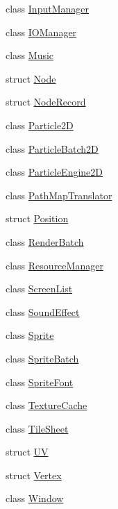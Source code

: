 \begin{DoxyCompactItemize}
\item 
class \hyperlink{class_otherwise_1_1_input_manager}{Input\+Manager}
\item 
class \hyperlink{class_otherwise_1_1_i_o_manager}{I\+O\+Manager}
\item 
class \hyperlink{class_otherwise_1_1_music}{Music}
\item 
struct \hyperlink{struct_otherwise_1_1_node}{Node}
\item 
struct \hyperlink{struct_otherwise_1_1_node_record}{Node\+Record}
\item 
class \hyperlink{class_otherwise_1_1_particle2_d}{Particle2D}
\item 
class \hyperlink{class_otherwise_1_1_particle_batch2_d}{Particle\+Batch2D}
\item 
class \hyperlink{class_otherwise_1_1_particle_engine2_d}{Particle\+Engine2D}
\item 
class \hyperlink{class_otherwise_1_1_path_map_translator}{Path\+Map\+Translator}
\item 
struct \hyperlink{struct_otherwise_1_1_position}{Position}
\item 
class \hyperlink{class_otherwise_1_1_render_batch}{Render\+Batch}
\item 
class \hyperlink{class_otherwise_1_1_resource_manager}{Resource\+Manager}
\item 
class \hyperlink{class_otherwise_1_1_screen_list}{Screen\+List}
\item 
class \hyperlink{class_otherwise_1_1_sound_effect}{Sound\+Effect}
\item 
class \hyperlink{class_otherwise_1_1_sprite}{Sprite}
\item 
class \hyperlink{class_otherwise_1_1_sprite_batch}{Sprite\+Batch}
\item 
class \hyperlink{class_otherwise_1_1_sprite_font}{Sprite\+Font}
\item 
class \hyperlink{class_otherwise_1_1_texture_cache}{Texture\+Cache}
\item 
class \hyperlink{class_otherwise_1_1_tile_sheet}{Tile\+Sheet}
\item 
struct \hyperlink{struct_otherwise_1_1_u_v}{UV}
\item 
struct \hyperlink{struct_otherwise_1_1_vertex}{Vertex}
\item 
class \hyperlink{class_otherwise_1_1_window}{Window}
\end{DoxyCompactItemize}
